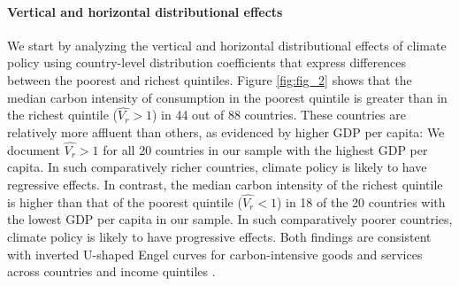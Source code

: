 \documentclass[12pt, a4paper]{article}
\begin{document}
\paragraph{Vertical and horizontal distributional effects}

We start by analyzing the vertical and horizontal distributional effects of climate policy using country-level distribution coefficients that express differences between the poorest and richest quintiles. Figure \ref{fig:fig_2} shows that the median carbon intensity of consumption in the poorest quintile is greater than in the richest quintile ($\widehat{V_{r}}>1$) in 44 out of 88 countries. These countries are relatively more affluent than others, as evidenced by higher GDP per capita: We document $\widehat{V_{r}}>1$ for all 20 countries in our sample with the highest GDP per capita. In such comparatively richer countries, climate policy is likely to have regressive effects. In contrast, the median carbon intensity of the richest quintile is higher than that of the poorest quintile ($\widehat{V_{r}}<1$) in 18 of the 20 countries with the lowest GDP per capita in our sample. In such comparatively poorer countries, climate policy is likely to have progressive effects. Both findings are consistent with inverted U-shaped Engel curves for carbon-intensive goods and services across countries and income quintiles \autocite{Dorband.2019}. 
\end{document}
